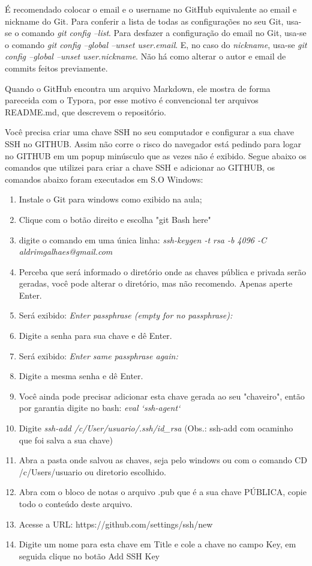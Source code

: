 \documentclass[12pt,a4paper]{article}
\begin{document}
	É recomendado colocar o email e o username no GitHub equivalente ao email e nickname do Git. Para conferir a lista de todas as configurações no seu Git, usa-se o comando \textit{git config --list}. Para desfazer a configuração do email no Git, usa-se o comando \textit{git config --global --unset user.email}. E, no caso do \textit{nickname}, usa-se	\textit{git config --global --unset user.nickname}. Não há como alterar o autor e email de commits feitos previamente.
	
	
	Quando o GitHub encontra um arquivo Markdown, ele mostra de forma pareceida com o Typora, por esse motivo é convencional ter arquivos README.md, que descrevem o repositório.
	
	 Você precisa criar uma chave SSH no seu computador e configurar a sua chave SSH no GITHUB. Assim não corre o risco do navegador está pedindo para logar no GITHUB em um popup minúsculo que as vezes não é exibido. Segue abaixo os comandos que utilizei para criar a chave SSH e adicionar ao GITHUB, os comandos abaixo foram executados em S.O Windows:
	
	\begin{enumerate}
		\item Instale o Git para windows como exibido na aula;
		\item Clique com o botão direito e escolha "git Bash here"
		\item digite o comando em uma única linha: \textit{ssh-keygen -t rsa -b 4096 -C aldrimgalhaes@gmail.com}
		\item Perceba que será informado o diretório onde as chaves pública e privada serão geradas, você pode alterar o diretório, mas não recomendo. Apenas aperte Enter.
		\item Será exibido:\textit{ Enter passphrase (empty for no passphrase):}
		\item Digite a senha para sua chave e dê Enter.
		\item Será exibido: \textit{Enter same passphrase again:}		
		\item Digite a mesma senha e dê Enter.
		\item Você ainda pode precisar adicionar esta chave gerada ao seu "chaveiro", então por garantia digite no bash: \textit{eval `ssh-agent`}
		\item Digite \textit{ssh-add /c/User/usuario/.ssh/id\_rsa}  (Obs.: ssh-add com ocaminho que foi salva a sua chave)
		\item Abra a pasta onde salvou as chaves, seja pelo windows ou com o comando CD /c/Users/usuario ou diretorio escolhido.
		\item Abra com o bloco de notas o arquivo .pub que é a sua chave PÚBLICA, copie todo o conteúdo deste arquivo.
		\item Acesse a URL: https://github.com/settings/ssh/new
		\item Digite um nome para esta chave em Title e cole a chave no campo Key, em seguida clique no botão Add SSH Key
	\end{enumerate}
	
\end{document}
